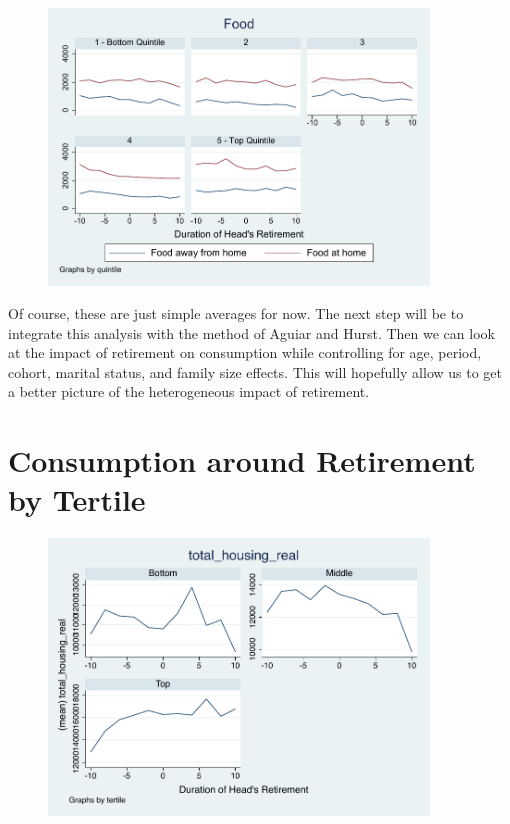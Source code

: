 \documentclass[11pt,onecolumn]{article}
\begin{document}
\begin{figure}[h]
	\centering
	\includegraphics[width=0.9\textwidth]{../ConsumptionPostRetirement/food.pdf}
\end{figure}

Of course, these are just simple averages for now. The next step will be to integrate this analysis with the method of Aguiar and Hurst. Then we can look at the impact of retirement on consumption while controlling for age, period, cohort, marital status, and family size effects. This will hopefully allow us to get a better picture of the heterogeneous impact of retirement.

\section{Consumption around Retirement by Tertile}

\begin{figure}[h]
	\centering
	\includegraphics[width=0.9\textwidth]{../ConsumptionPostRetirement/Tertile_5/total_housing_real.pdf}
\end{figure}
\end{document}
